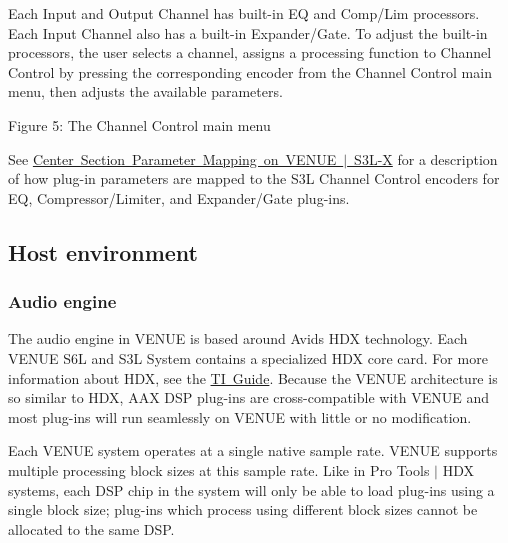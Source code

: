  Each Input and Output Channel has built-\/in EQ and Comp/\+Lim processors. Each Input Channel also has a built-\/in Expander/\+Gate. To adjust the built-\/in processors, the user selects a channel, assigns a processing function to Channel Control by pressing the corresponding encoder from the Channel Control main menu, then adjusts the available parameters.

  Figure 5\+: The Channel Control main menu

 See \mbox{\hyperlink{a00833_aax_page_table_guide_04_avid_center_section_page_tables_venue_s3l_mapping}{Center Section Parameter Mapping on V\+E\+N\+UE $\vert$ S3\+L-\/X}} for a description of how plug-\/in parameters are mapped to the S3L Channel Control encoders for EQ, Compressor/\+Limiter, and Expander/\+Gate plug-\/ins.



 \hypertarget{a00849_aax_venue_guide__environment}{}\subsection{Host environment}\label{a00849_aax_venue_guide__environment}
\hypertarget{a00849_aax_venue_guide__environment__audio_engine}{}\subsubsection{Audio engine}\label{a00849_aax_venue_guide__environment__audio_engine}
 The audio engine in V\+E\+N\+UE is based around Avid\textquotesingle{}s H\+DX technology. Each V\+E\+N\+UE S6L and S3L System contains a specialized H\+DX core card. For more information about H\+DX, see the \mbox{\hyperlink{a00832}{TI Guide}}. Because the V\+E\+N\+UE architecture is so similar to H\+DX, A\+AX D\+SP plug-\/ins are cross-\/compatible with V\+E\+N\+UE and most plug-\/ins will run seamlessly on V\+E\+N\+UE with little or no modification.

 Each V\+E\+N\+UE system operates at a single native sample rate. V\+E\+N\+UE supports multiple processing block sizes at this sample rate. Like in Pro Tools $\vert$ H\+DX systems, each D\+SP chip in the system will only be able to load plug-\/ins using a single block size; plug-\/ins which process using different block sizes cannot be allocated to the same D\+SP.

